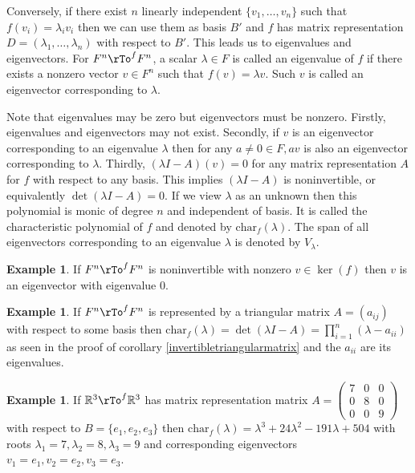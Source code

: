 \documentclass[12pt]{amsart}
\theoremstyle{definition}
\newtheorem{example}[theorem]{Example}
\begin{document}
Conversely, if there exist $n$ linearly independent $\{v_1, \dots , v_n\}$ such that $f(v_i) = \lambda_i v_i$ then we can use them as basis $B'$ and $f$ has matrix representation $D = (\lambda_1, \dots , \lambda_n)$ with respect to $B'$. This leads us to eigenvalues and eigenvectors.
\dfn For $F^n \rTo^f F^n$, a scalar $\lambda \in F$ is called an eigenvalue of $f$ if there exists a nonzero vector $v \in F^n$ such that $f(v) = \lambda v$. Such $v$ is called an eigenvector corresponding to $\lambda$.

Note that eigenvalues may be zero but eigenvectors must be nonzero. Firstly, eigenvalues and eigenvectors may not exist. Secondly, if $v$ is an eigenvector corresponding to an eigenvalue $\lambda$ then for any $a \neq 0 \in F, a v$ is also an eigenvector corresponding to $\lambda$. Thirdly, $(\lambda I - A)(v) = 0$ for any matrix representation $A$ for $f$ with respect to any basis. This implies $(\lambda I - A)$ is noninvertible, or equivalently $\det(\lambda I - A) = 0$. If we view $\lambda$ as an unknown then this polynomial is monic of degree $n$ and independent of basis. It is called the characteristic polynomial of $f$ and denoted by $\text{char}_f(\lambda)$. The span of all eigenvectors corresponding to an eigenvalue $\lambda$ is denoted by $V_{\lambda}$.

\begin{example}\label{} If $F^n \rTo^f F^n$ is noninvertible with nonzero $v \in \ker(f)$ then $v$ is an eigenvector with eigenvalue 0.
\end{example}

\begin{example}\label{} If $F^n \rTo^f F^n$ is represented by a triangular matrix $A = (a_{ij})$ with respect to some basis then $\text{char}_f(\lambda) = \det(\lambda I - A) = \prod\limits_{i = 1}^n (\lambda - a_{ii})$ as seen in the proof of corollary \ref{invertibletriangularmatrix} and the $a_{ii}$ are its eigenvalues.
\end{example}

\begin{example}\label{eigenvalues1} If $\mathbb{R}^3 \rTo^f \mathbb{R}^3$ has matrix representation matrix $A = \left(\begin{array}{ccc} 7 & 0 & 0 \\ 0 & 8 & 0 \\ 0 & 0 & 9 \end{array}\right)$ with respect to $B = \{e_1, e_2, e_3\}$ then $\text{char}_f(\lambda) = \lambda^3 + 24 \lambda^2 - 191\lambda + 504$ with roots $\lambda_ 1 = 7, \lambda_2 = 8, \lambda_3 = 9$ and corresponding eigenvectors $v_1 = e_1, v_2 = e_2, v_3 = e_3$.
\end{example}
\end{document}
